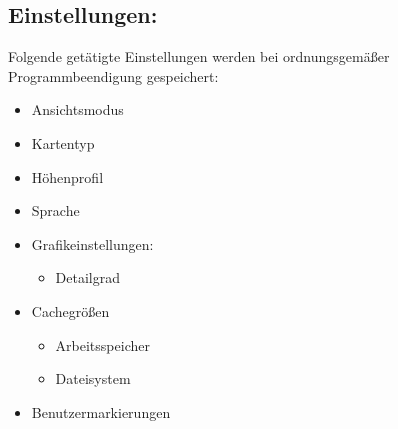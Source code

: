 \documentclass[10pt]{scrreprt}
\begin{document}
\subsection*{Einstellungen:}
Folgende getätigte Einstellungen werden bei ordnungsgemäßer Programmbeendigung gespeichert:
\begin{itemize}
\item Ansichtsmodus
\item Kartentyp
\item Höhenprofil
\item Sprache
\item Grafikeinstellungen:
	\begin{itemize}
	\item Detailgrad
	\end{itemize}
\item Cachegrößen
	\begin{itemize}
	\item Arbeitsspeicher
	\item Dateisystem
	\end{itemize}
\item Benutzermarkierungen
\end{itemize}




\cleardoublepage
{}
\printindex
\end{document}
